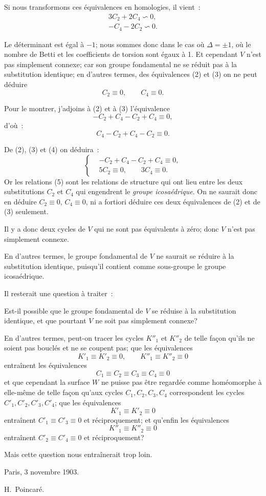 \documentclass{article}
\begin{document}
Si nous transformons ces équivalences en homologies, il vient~:
\[ \begin{gathered} 3C_{2} + 2C_{4} \backsim 0,\\ -C_{4} - 2C_{2} \backsim 0. \end{gathered} \]

Le déterminant est égal à $-1$; nous sommes donc dans le cas où $\Delta = \pm 1$, où le nombre de Betti et les coefficients de torsion sont égaux à 1. Et cependant $V$ n'est pas simplement connexe; car son groupe fondamental ne se réduit pas à la substitution identique; en d'autres termes, des équivalences (2) et (3) on ne peut déduire
\[ C_{2} \equiv 0, \qquad C_{4} \equiv 0. \]

Pour le montrer, j'adjoins à (2) et à (3) l'équivalence
\[ -C_{2} + C_{4} - C_{2} + C_{4} \equiv 0, \tag{4} \]
d'où~:
\[ C_{4} - C_{2} + C_{4} - C_{2} \equiv 0. \]

De (2), (3) et (4) on déduira~:
\[ \left\{ \begin{aligned} &-C_{2} + C_{4} - C_{2} + C_{4} \equiv 0,\\ &5C_{2} \equiv 0, \qquad 3C_{4} \equiv 0. \end{aligned} \right. \tag{5} \]
Or les relations (5) sont les relations de structure qui ont lieu entre les deux substitutions $C_{2}$ et $C_{4}$ qui engendrent le \emph{groupe icosaédrique}. On ne saurait donc en déduire $C_{2} \equiv 0$, $C_{4} \equiv 0$, ni a fortiori déduire ces deux équivalences de (2) et de (3) seulement.

Il y a donc deux cycles de $V$ qui ne sont pas équivalents à zéro; donc $V$ n'est pas simplement connexe.

En d'autres termes, le groupe fondamental de $V$ ne saurait se réduire à la substitution identique, puisqu'il contient comme sous-groupe le groupe icosaédrique.

Il resterait une question à traiter~:

Est-il possible que le groupe fondamental de $V$ se réduise à la substitution identique, et que pourtant $V$ ne soit pas simplement connexe?

En d'autres termes, peut-on tracer les cycles $K''_{1}$ et $K''_{2}$ de telle façon qu'ils ne soient pas bouclés et ne se coupent pas; que les équivalences
\[ K'_{1} \equiv K'_{2} \equiv 0, \qquad K''_{1} \equiv K''_{2} \equiv 0 \]
entraînent les équivalences
\[ C_{1} \equiv C_{2} \equiv C_{3} \equiv C_{4} \equiv 0 \]
et que cependant la surface $W$ ne puisse pas être regardée comme homéomorphe à elle-même de telle façon qu'aux cycles $C_{1}, C_{2}, C_{3}, C_{4}$ correspondent les cycles $C'_{1}, C'_{2}, C'_{3}, C'_{4}$; que les équivalences
\[ K'_{1} \equiv K'_{2} \equiv 0 \]
entraînent $C'_{1} \equiv C'_{3} \equiv 0$ et réciproquement; et qu'enfin les équivalences
\[ K''_{1} \equiv K''_{2} \equiv 0 \]
entraînent $C'_{2} \equiv C'_{4} \equiv 0$ et réciproquement?

Mais cette question nous entraînerait trop loin.

Paris, 3 novembre 1903.

H.~Poincaré.
\end{document}
